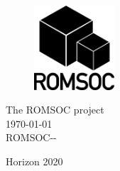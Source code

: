 \documentclass{ROMSOC}
\begin{document}
\lofoot[\footerlogo \hspace{10pt} \footertext]{\footerlogo \hspace{10pt} \footertext}
\lefoot[\footerlogo \hspace{10pt} \footertext]{\footerlogo \hspace{10pt} \footertext}

\rofoot[\pagemark]{\pagemark}

\rohead{\rightmark}
\rehead{\rightmark}

\setcounter{page}{1}
\pagestyle{scrheadings}

\hypersetup{pageanchor=true}


%


\label{finalpg}
\clearpage

\thispagestyle{empty}
\begin{center}
\vfill
\begin{figure}
\centering
\vspace{7cm}
  \includegraphics[width=3cm]{./images/ROMSOC_Logo_bw}
\end{figure}
\vfill
{\large The ROMSOC project\\[0.5cm] }
{\large \today \\[0.5cm] }
{\large ROMSOC-\DelNumber-\DelVersion\\[0.5cm] }
\vfill

Horizon 2020

\end{center}
\end{document}
